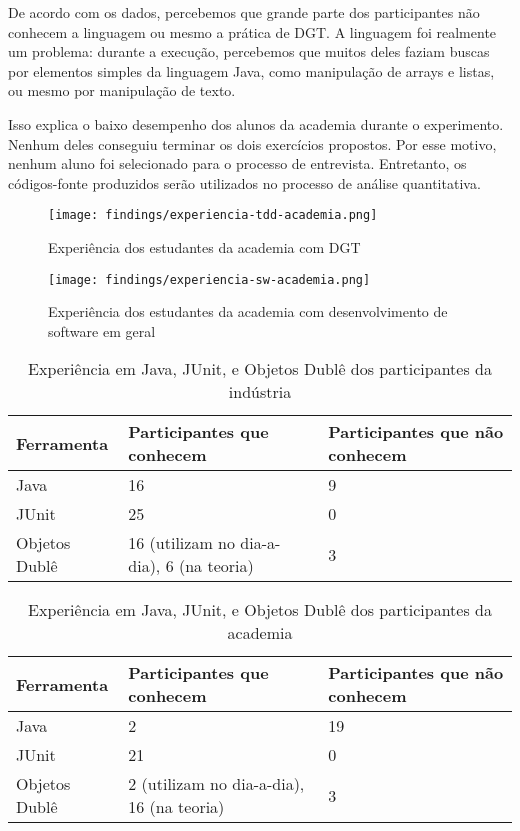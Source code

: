 De acordo com os dados, percebemos que grande parte dos participantes não conhecem a linguagem ou
mesmo a prática de DGT. A linguagem foi realmente um problema: durante a execução, percebemos
que muitos deles faziam buscas por elementos simples da linguagem Java, como manipulação de arrays
e listas, ou mesmo por manipulação de texto.

Isso explica o baixo desempenho dos alunos da academia durante
o experimento. Nenhum deles conseguiu terminar os dois exercícios propostos. Por esse
motivo, nenhum aluno foi selecionado para o processo de entrevista. Entretanto,
os códigos-fonte produzidos serão utilizados no processo de análise quantitativa.

\begin{figure}[h!]
  \centering
  \texttt{[image: findings/experiencia-tdd-academia.png]}
  \caption{Experiência dos estudantes da academia com DGT}
  \label{fig:exp-tdd-academia}
\end{figure}

\begin{figure}[h!]
  \centering
  \texttt{[image: findings/experiencia-sw-academia.png]}
  \caption{Experiência dos estudantes da academia com desenvolvimento de software em geral}
  \label{fig:exp-sw-academia}
\end{figure}


\begin{table}
	\begin{tabular}{ | p{5cm} | p{5cm} | p{5cm} | }
		\hline
		Ferramenta & Participantes que conhecem & Participantes que não conhecem\\
		\hline
		Java & 16 & 9\\
		JUnit & 25 & 0\\
		Objetos Dublê & 16 (utilizam no dia-a-dia), 6 (na teoria) & 3\\
		\hline
	\end{tabular}
	\caption{Experiência em Java, JUnit, e Objetos Dublê dos participantes da indústria}
	\label{tab:exp-industria}
\end{table}

\begin{table}
	\begin{tabular}{ | p{5cm} | p{5cm} | p{5cm} | }
		\hline
		Ferramenta & Participantes que conhecem & Participantes que não conhecem\\
		\hline
		Java & 2 & 19\\
		JUnit & 21 & 0\\
		Objetos Dublê & 2 (utilizam no dia-a-dia), 16 (na teoria) & 3\\
		\hline
	\end{tabular}
	\caption{Experiência em Java, JUnit, e Objetos Dublê dos participantes da academia}
	\label{tab:exp-academia}
\end{table}

